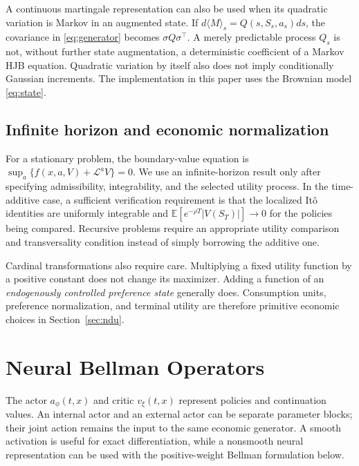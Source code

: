 \documentclass[ecta,nameyear,draft]{econsocart}
\theoremstyle{definition}
\theoremstyle{remark}
\newcommand{\E}{\mathbb E}
\newcommand{\LL}{\mathcal L}
\begin{document}
A continuous martingale representation can also be used when its quadratic variation is Markov in an augmented state. If $d\langle M\rangle_s=Q(s,S_s,a_s)ds$, the covariance in \eqref{eq:generator} becomes $\sigma Q\sigma^\top$. A merely predictable process $Q_s$ is not, without further state augmentation, a deterministic coefficient of a Markov HJB equation. Quadratic variation by itself also does not imply conditionally Gaussian increments. The implementation in this paper uses the Brownian model \eqref{eq:state}.

\subsection{Infinite horizon and economic normalization}
For a stationary problem, the boundary-value equation is $\sup_a\{f(x,a,V)+\LL^aV\}=0$. We use an infinite-horizon result only after specifying admissibility, integrability, and the selected utility process. In the time-additive case, a sufficient verification requirement is that the localized It\^o identities are uniformly integrable and $\E[e^{-\rho T}|V(S_T)|]\to0$ for the policies being compared. Recursive problems require an appropriate utility comparison and transversality condition instead of simply borrowing the additive one.

Cardinal transformations also require care. Multiplying a fixed utility function by a positive constant does not change its maximizer. Adding a function of an \emph{endogenously controlled preference state} generally does. Consumption units, preference normalization, and terminal utility are therefore primitive economic choices in Section~\ref{sec:ndu}.

\section{Neural Bellman Operators}\label{sec:method}
The actor $a_\phi(t,x)$ and critic $v_\xi(t,x)$ represent policies and continuation values. An internal actor and an external actor can be separate parameter blocks; their joint action remains the input to the same economic generator. A smooth activation is useful for exact differentiation, while a nonsmooth neural representation can be used with the positive-weight Bellman formulation below.
\end{document}
